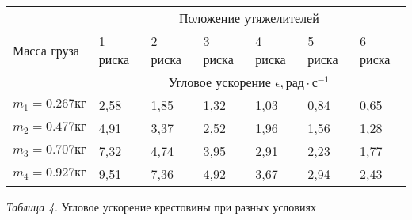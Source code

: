 \begin{center}
    \begin{tabular}{|p{2.5cm}|p{2cm}|p{2cm}|p{2cm}|p{2cm}|p{2cm}|p{2cm}|}
        \hline
        \multirow{3}{*}{Масса груза} & \multicolumn{6}{c|}{Положение утяжелителей} \\
        \cline{2-7}
        & 1 риска       & 2 риска & 3 риска & 4 риска & 5 риска & 6 риска \\
        \cline{2-7}
        & \multicolumn{6}{c|}{Угловое ускорение $\epsilon, \text{рад} \cdot \text{с}^{-1}$} \\
        \hline
        $m_1 = 0.267 \text{кг}$ &   2,58    &   1,85    &    1,32   &    1,03   &    0,84   &   0,65    \\
        \hline
        $m_2 = 0.477 \text{кг}$ &   4,91    &   3,37    &    2,52   &    1,96   &    1,56   &   1,28    \\
        \hline
        $m_3 = 0.707 \text{кг}$ &   7,32    &   4,74    &    3,95   &    2,91   &    2,23   &   1,77    \\
        \hline
        $m_4 = 0.927 \text{кг}$ &   9,51    &   7,36    &    4,92   &    3,67   &    2,94   &   2,43    \\
        \hline

    \end{tabular}

    \smallvspace

    \textit{Таблица 4.} Угловое ускорение крестовины при разных условиях
\end{center}
